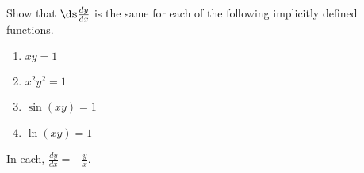 {Show that $\ds \frac{dy}{dx}$ is the same for each of the following implicitly defined functions.
\begin{enumerate}
\item		$xy=1$
\item		$x^2y^2=1$
\item		$\sin(xy) = 1$
\item		$\ln (xy) =1$
\end{enumerate}
}
{In each, $\frac{dy}{dx} = -\frac yx$.
}
